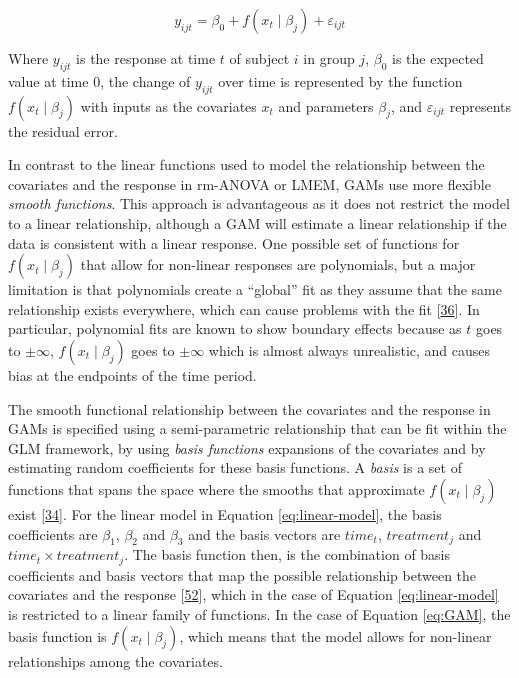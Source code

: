 \documentclass[
]{article}
\begin{document}
\begin{equation}
  y_{ijt}=\beta_0+f(x_t\mid \beta_j)+\varepsilon_{ijt}
  \label{eq:GAM}
\end{equation}

Where \(y_{ijt}\) is the response at time \(t\) of subject \(i\) in group \(j\), \(\beta_0\) is the expected value at time 0, the change of \(y_{ijt}\) over time is represented by the function \(f(x_t\mid \beta_j)\) with inputs as the covariates \(x_t\) and parameters \(\beta_j\), and \(\varepsilon_{ijt}\) represents the residual error.

In contrast to the linear functions used to model the relationship between the covariates and the response in rm-ANOVA or LMEM, GAMs use more flexible \emph{smooth functions}. This approach is advantageous as it does not restrict the model to a linear relationship, although a GAM will estimate a linear relationship if the data is consistent with a linear response. One possible set of functions for \(f(x_t\mid \beta_j)\) that allow for non-linear responses are polynomials, but a major limitation is that polynomials create a ``global'' fit as they assume that the same relationship exists everywhere, which can cause problems with the fit {[}\protect\hyperlink{ref-beck1998}{36}{]}. In particular, polynomial fits are known to show boundary effects because as \(t\) goes to \(\pm \infty\), \(f(x_t \mid \beta_j)\) goes to \(\pm \infty\) which is almost always unrealistic, and causes bias at the endpoints of the time period.

The smooth functional relationship between the covariates and the response in GAMs is specified using a semi-parametric relationship that can be fit within the GLM framework, by using \emph{basis functions} expansions of the covariates and by estimating random coefficients for these basis functions. A \emph{basis} is a set of functions that spans the space where the smooths that approximate \(f(x_t \mid \beta_j)\) exist {[}\protect\hyperlink{ref-simpson2018}{34}{]}. For the linear model in Equation \eqref{eq:linear-model}, the basis coefficients are \(\beta_1\), \(\beta_2\) and \(\beta_3\) and the basis vectors are \(time_t\), \(treatment_j\) and \(time_t \times treatment_j\). The basis function then, is the combination of basis coefficients and basis vectors that map the possible relationship between the covariates and the response {[}\protect\hyperlink{ref-hefley2017}{52}{]}, which in the case of Equation \eqref{eq:linear-model} is restricted to a linear family of functions. In the case of Equation \eqref{eq:GAM}, the basis function is \(f(x_t\mid \beta_j)\), which means that the model allows for non-linear relationships among the covariates.
\end{document}
